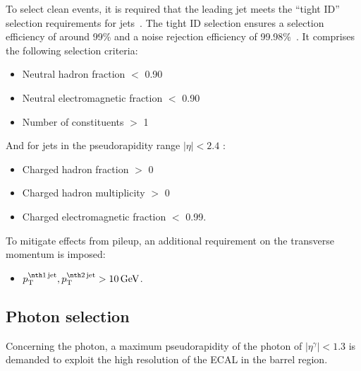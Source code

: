 To select clean \GAMJET events, it is required that the leading jet meets the ``tight ID'' selection requirements for jets~\cite{bib:JetIDRecommendation_7TeV,bib:AN:JetId_8TeV}.
The tight ID selection ensures a selection efficiency of around 99\% and a noise rejection efficiency of 99.98\%~\cite{bib:JetIDRecommendation_7TeV}.
It comprises the following selection criteria:
\begin{itemize}
 \item Neutral hadron fraction $<$ 0.90
 \item Neutral electromagnetic fraction $<$ 0.90
 \item Number of constituents $>$ 1
\end{itemize}
 And for jets in the pseudorapidity range $|\eta| < 2.4 $ :
\begin{itemize}
 \item Charged hadron fraction $>$ 0
 \item Charged hadron multiplicity $>$ 0
 \item Charged electromagnetic fraction $<$ 0.99.
\end{itemize}

To mitigate effects from pileup, an additional requirement on the  transverse momentum is imposed:
\begin{itemize}
\item $\ptfirstjet,\ptsecondjet>10\gev$.
\end{itemize}

\subsection*{Photon selection}
Concerning the photon, a maximum pseudorapidity of the photon of $|\eta^{\gamma}| < 1.3$ is demanded to exploit the high resolution of the ECAL in the barrel region.

